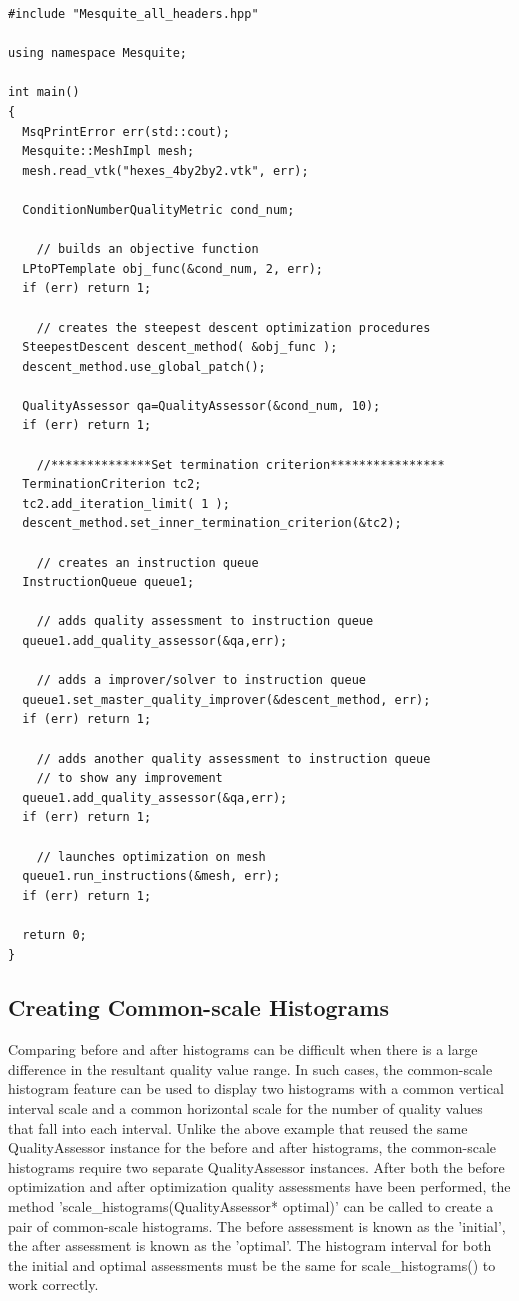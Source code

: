 \begin{lstlisting}[frame=single]
#include "Mesquite_all_headers.hpp"

using namespace Mesquite;

int main()
{
  MsqPrintError err(std::cout);
  Mesquite::MeshImpl mesh;
  mesh.read_vtk("hexes_4by2by2.vtk", err);

  ConditionNumberQualityMetric cond_num;

    // builds an objective function
  LPtoPTemplate obj_func(&cond_num, 2, err);
  if (err) return 1;

    // creates the steepest descent optimization procedures
  SteepestDescent descent_method( &obj_func );
  descent_method.use_global_patch();

  QualityAssessor qa=QualityAssessor(&cond_num, 10);
  if (err) return 1;

    //**************Set termination criterion****************
  TerminationCriterion tc2;
  tc2.add_iteration_limit( 1 );
  descent_method.set_inner_termination_criterion(&tc2);

    // creates an instruction queue
  InstructionQueue queue1;

    // adds quality assessment to instruction queue
  queue1.add_quality_assessor(&qa,err);

    // adds a improver/solver to instruction queue
  queue1.set_master_quality_improver(&descent_method, err);
  if (err) return 1;

    // adds another quality assessment to instruction queue
    // to show any improvement
  queue1.add_quality_assessor(&qa,err);
  if (err) return 1;

    // launches optimization on mesh
  queue1.run_instructions(&mesh, err);
  if (err) return 1;

  return 0;
}
\end{lstlisting}


\subsection{Creating Common-scale Histograms}
\label{sec:creating_histograms}

Comparing before and after histograms can be difficult when there is a large difference in the resultant quality value range.  In such cases, the common-scale histogram feature can be used to display two histograms with a common vertical interval scale and a common horizontal scale for the number of quality values that fall into each interval.  Unlike the above example that reused the same QualityAssessor instance for the before and after histograms, the common-scale histograms require two separate QualityAssessor instances.  After both the before optimization and after optimization quality assessments have been performed, the method 'scale\_histograms(QualityAssessor* optimal)' can be called to create a pair of common-scale histograms.  The before assessment is known as the 'initial', the after assessment is known as the 'optimal'.   The histogram interval for both the initial and optimal assessments must be the same for scale\_histograms() to work correctly.

